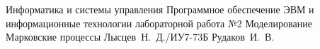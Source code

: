 \documentclass{bmstu}
\begin{document}
\makereporttitle
{Информатика и системы управления} %
{Программное обеспечение ЭВМ и информационные технологии}
{лабораторной работа №2} %
{Моделирование} %
{Марковские процессы} %
{} %
{Лысцев~Н.~Д./ИУ7-73Б} %
{Рудаков~И.~В.} %
{}

\maketableofcontents

%



%
%

\end{document}

